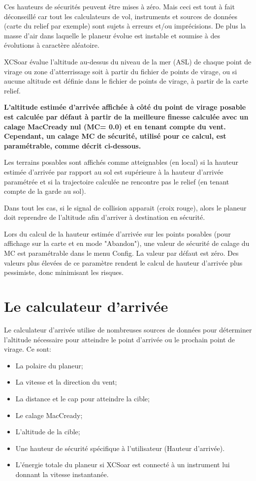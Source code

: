 \warning
Ces hauteurs de sécurités peuvent être mises à zéro. Mais ceci est tout à fait déconseillé car tout les calculateurs de vol, instruments et sources de données (carte du relief par exemple) sont sujets à erreurs et/ou imprécisions. De plus la masse d'air dans laquelle le planeur évolue est instable et soumise à des évolutions à caractère aléatoire.

XCSoar évalue l'altitude au-dessus du niveau de la mer (ASL) de chaque point de virage ou zone d'atterrissage soit à partir du fichier de points de virage, ou si aucune altitude est définie dans le fichier de points de virage, à partir de la carte relief.

\textbf{L'altitude estimée d'arrivée affichée à côté du point de virage posable est calculée par défaut à partir de la meilleure finesse calculée avec un calage MacCready nul (MC= 0.0) et en tenant compte du vent. Cependant, un calage MC de sécurité, utilisé pour ce calcul,  est paramétrable, comme décrit ci-dessous.}

Les terrains posables sont affichés comme atteignables (en local) si la hauteur estimée d'arrivée par rapport au sol  est supérieure à la hauteur d'arrivée paramétrée et si la trajectoire calculée ne rencontre pas le relief (en tenant compte de la garde au sol).

Dans tout les cas, si le signal de collision apparait (croix rouge), alors le planeur doit reprendre de l'altitude afin d'arriver à destination en sécurité.

Lors du calcul de la hauteur estimée d'arrivée sur les points posables (pour affichage sur la carte et en mode "Abandon"), une valeur de sécurité de calage du MC  est paramétrable dans le menu Config. La valeur par défaut est zéro. Des valeurs plus élevées de ce paramètre rendent le calcul de hauteur d'arrivée plus pessimiste, donc minimisant les risques.

\section{Le calculateur d'arrivée}

Le calculateur d'arrivée utilise de nombreuses sources de données pour déterminer l'altitude nécessaire pour atteindre le point d'arrivée ou le prochain point de virage. Ce sont:

\begin{itemize}
\item La polaire du planeur;
\item La vitesse et la direction du vent;
\item La distance et le cap pour atteindre la cible;
\item Le calage MacCready;
\item L'altitude de la cible;
\item Une hauteur de sécurité spécifique à l'utilisateur (Hauteur d'arrivée).
\item L'énergie totale du planeur si XCSoar est connecté à un instrument lui donnant la vitesse instantanée.
\end{itemize}


